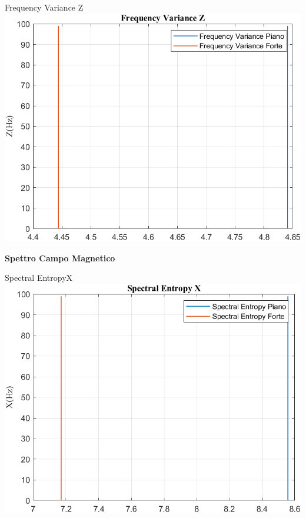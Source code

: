	\begin{frame}{{Frequency Variance Z}}
		\centering\includegraphics[height=.8\textheight]{figure/Mag/Trasformata/Frequency VarianceZ}
	\end{frame}
	
	\begin{frame}
		\color{blue}\centering\huge{\textbf{Spettro Campo Magnetico}}
	\end{frame}
	
	\begin{frame}{{Spectral EntropyX}}
		\centering\includegraphics[height=.8\textheight]{figure/Mag/Trasformata/Spectral EntropyX}
	\end{frame}
	
